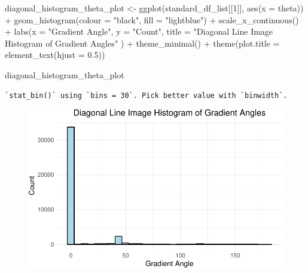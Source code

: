 \documentclass[
  letterpaper,
]{report}
\newenvironment{Shaded}{\begin{snugshade}}{\end{snugshade}}
\newcommand{\AttributeTok}[1]{\textcolor[rgb]{0.40,0.45,0.13}{#1}}
\newcommand{\DecValTok}[1]{\textcolor[rgb]{0.68,0.00,0.00}{#1}}
\newcommand{\FloatTok}[1]{\textcolor[rgb]{0.68,0.00,0.00}{#1}}
\newcommand{\FunctionTok}[1]{\textcolor[rgb]{0.28,0.35,0.67}{#1}}
\newcommand{\NormalTok}[1]{\textcolor[rgb]{0.00,0.23,0.31}{#1}}
\newcommand{\OtherTok}[1]{\textcolor[rgb]{0.00,0.23,0.31}{#1}}
\newcommand{\SpecialCharTok}[1]{\textcolor[rgb]{0.37,0.37,0.37}{#1}}
\newcommand{\StringTok}[1]{\textcolor[rgb]{0.13,0.47,0.30}{#1}}
\begin{document}
\begin{Shaded}
\begin{Highlighting}[]
\NormalTok{diagonal\_histogram\_theta\_plot }\OtherTok{\textless{}{-}}
  \FunctionTok{ggplot}\NormalTok{(standard\_df\_list[[}\DecValTok{1}\NormalTok{]], }
         \FunctionTok{aes}\NormalTok{(}\AttributeTok{x =}\NormalTok{ theta)) }\SpecialCharTok{+}
  \FunctionTok{geom\_histogram}\NormalTok{(}\AttributeTok{colour =} \StringTok{"black"}\NormalTok{, }\AttributeTok{fill =} \StringTok{"lightblue"}\NormalTok{) }\SpecialCharTok{+}
  \FunctionTok{scale\_x\_continuous}\NormalTok{() }\SpecialCharTok{+} 
  \FunctionTok{labs}\NormalTok{(}\AttributeTok{x =} \StringTok{"Gradient Angle"}\NormalTok{, }
       \AttributeTok{y =} \StringTok{"Count"}\NormalTok{, }
       \AttributeTok{title =} \StringTok{"Diagonal Line Image Histogram of Gradient Angles"}
\NormalTok{       ) }\SpecialCharTok{+}
  \FunctionTok{theme\_minimal}\NormalTok{() }\SpecialCharTok{+}
  \FunctionTok{theme}\NormalTok{(}\AttributeTok{plot.title =} \FunctionTok{element\_text}\NormalTok{(}\AttributeTok{hjust =} \FloatTok{0.5}\NormalTok{))}

\NormalTok{diagonal\_histogram\_theta\_plot}
\end{Highlighting}
\end{Shaded}

\begin{verbatim}
`stat_bin()` using `bins = 30`. Pick better value with `binwidth`.
\end{verbatim}

\begin{figure}[H]

{\centering \includegraphics{results_files/figure-pdf/unnamed-chunk-9-6.pdf}

}

\end{figure}
\end{document}
